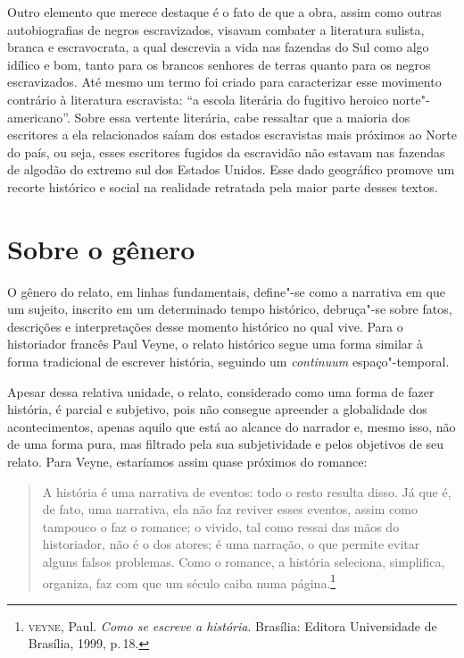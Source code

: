 Outro elemento que merece destaque é o fato de que a obra, assim como
outras autobiografias de negros escravizados, visavam combater a
literatura sulista, branca e escravocrata, a qual descrevia a vida nas
fazendas do Sul como algo idílico e bom, tanto para os brancos senhores
de terras quanto para os negros escravizados. Até mesmo um termo foi
criado para caracterizar esse movimento contrário à literatura
escravista: ``a escola literária do fugitivo heroico norte"-americano''.
Sobre essa vertente literária, cabe ressaltar que a maioria dos
escritores a ela relacionados saíam dos estados escravistas mais
próximos ao Norte do país, ou seja, esses escritores fugidos da
escravidão não estavam nas fazendas de algodão do extremo sul dos
Estados Unidos. Esse dado geográfico promove um recorte histórico e
social na realidade retratada pela maior parte desses textos.


\section{Sobre o gênero}

O gênero do relato, em linhas fundamentais, define"-se como a narrativa em que um sujeito, inscrito em um determinado tempo histórico, debruça"-se sobre fatos, descrições e interpretações desse momento histórico no qual vive. Para o historiador francês Paul Veyne, o relato histórico segue uma forma similar à forma tradicional de escrever história, seguindo um \textit{continuum} espaço"-temporal.

Apesar dessa relativa unidade, o relato, considerado como uma forma de fazer história,
é parcial e subjetivo, pois não consegue apreender a globalidade dos acontecimentos, apenas
aquilo que está ao alcance do narrador e, mesmo isso, não de uma forma pura, mas filtrado pela sua subjetividade e pelos objetivos de seu relato.
Para Veyne, estaríamos assim quase próximos do romance:

\begin{quote}
A história é uma narrativa de eventos: todo o resto resulta disso. Já que é, de fato, uma narrativa, ela não faz reviver esses eventos, assim como tampouco o faz o romance; o vivido, tal como ressai das mãos do historiador, não é o dos atores; é uma narração,
o que permite evitar alguns falsos problemas. Como o romance, a
história seleciona, simplifica, organiza, faz com que um século
caiba numa página.\footnote{\textsc{veyne}, Paul. \textit{Como se escreve a história}. Brasília: Editora Universidade de Brasília, 1999, p.\,18.}
\end{quote}


